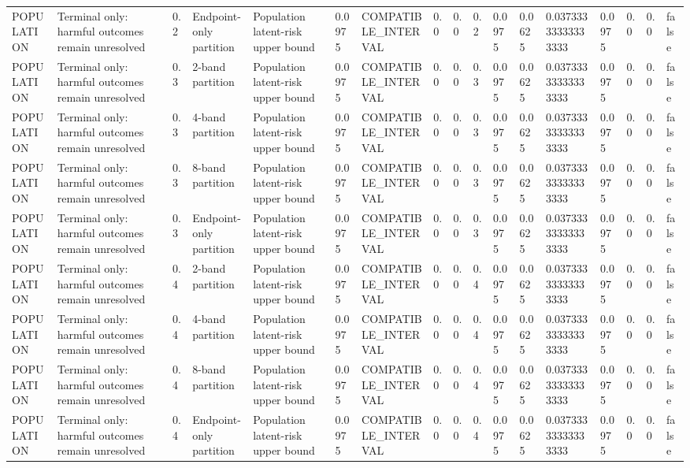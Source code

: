 \begin{tabular}{lllllllllllllllll}
POPULATION & Terminal only: harmful outcomes remain unresolved & 0.2 & Endpoint-only partition & Population latent-risk upper bound & 0.0975 & COMPATIBLE\_INTERVAL & 0.0 & 0.0 & 0.2 & 0.0975 & 0.0625 & 0.03733333333333333 & 0.0975 & 0.0 & 0.0 & false \\
POPULATION & Terminal only: harmful outcomes remain unresolved & 0.3 & 2-band partition & Population latent-risk upper bound & 0.0975 & COMPATIBLE\_INTERVAL & 0.0 & 0.0 & 0.3 & 0.0975 & 0.0625 & 0.03733333333333333 & 0.0975 & 0.0 & 0.0 & false \\
POPULATION & Terminal only: harmful outcomes remain unresolved & 0.3 & 4-band partition & Population latent-risk upper bound & 0.0975 & COMPATIBLE\_INTERVAL & 0.0 & 0.0 & 0.3 & 0.0975 & 0.0625 & 0.03733333333333333 & 0.0975 & 0.0 & 0.0 & false \\
POPULATION & Terminal only: harmful outcomes remain unresolved & 0.3 & 8-band partition & Population latent-risk upper bound & 0.0975 & COMPATIBLE\_INTERVAL & 0.0 & 0.0 & 0.3 & 0.0975 & 0.0625 & 0.03733333333333333 & 0.0975 & 0.0 & 0.0 & false \\
POPULATION & Terminal only: harmful outcomes remain unresolved & 0.3 & Endpoint-only partition & Population latent-risk upper bound & 0.0975 & COMPATIBLE\_INTERVAL & 0.0 & 0.0 & 0.3 & 0.0975 & 0.0625 & 0.03733333333333333 & 0.0975 & 0.0 & 0.0 & false \\
POPULATION & Terminal only: harmful outcomes remain unresolved & 0.4 & 2-band partition & Population latent-risk upper bound & 0.0975 & COMPATIBLE\_INTERVAL & 0.0 & 0.0 & 0.4 & 0.0975 & 0.0625 & 0.03733333333333333 & 0.0975 & 0.0 & 0.0 & false \\
POPULATION & Terminal only: harmful outcomes remain unresolved & 0.4 & 4-band partition & Population latent-risk upper bound & 0.0975 & COMPATIBLE\_INTERVAL & 0.0 & 0.0 & 0.4 & 0.0975 & 0.0625 & 0.03733333333333333 & 0.0975 & 0.0 & 0.0 & false \\
POPULATION & Terminal only: harmful outcomes remain unresolved & 0.4 & 8-band partition & Population latent-risk upper bound & 0.0975 & COMPATIBLE\_INTERVAL & 0.0 & 0.0 & 0.4 & 0.0975 & 0.0625 & 0.03733333333333333 & 0.0975 & 0.0 & 0.0 & false \\
POPULATION & Terminal only: harmful outcomes remain unresolved & 0.4 & Endpoint-only partition & Population latent-risk upper bound & 0.0975 & COMPATIBLE\_INTERVAL & 0.0 & 0.0 & 0.4 & 0.0975 & 0.0625 & 0.03733333333333333 & 0.0975 & 0.0 & 0.0 & false \\

\end{tabular}

